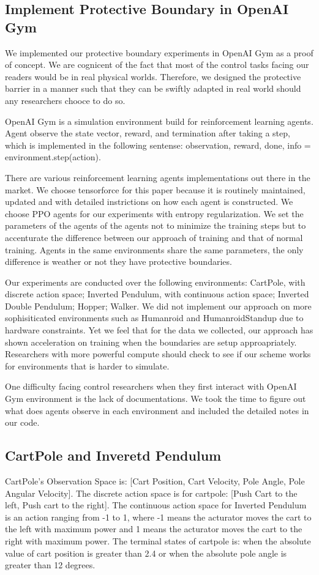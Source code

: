 \documentclass[journal]{IEEEtran}
\begin{document}
\subsection{Implement Protective Boundary in OpenAI Gym}
We implemented our protective boundary experiments in OpenAI Gym as a proof of concept. We are cognicent of the fact that most of the control tasks facing our readers would be in real physical worlds. Therefore, we designed the protective barrier in a manner such that they can be swiftly adapted in real world should any researchers chooce to do so.

OpenAI Gym is a simulation environment build for reinforcement learning agents. Agent observe the state vector, reward, and termination after taking a step, which is implemented in the following sentense: observation, reward, done, info = environment.step(action).

There are various reinforcement learning agents implementations out there in the market. We choose tensorforce for this paper because it is routinely maintained, updated and with detailed instrictions on how each agent is constructed. We choose PPO agents for our experiments with entropy regularization. We set the parameters of the agents of the agents not to minimize the training steps but to accenturate the difference between our approach of training and that of normal training. Agents in the same environments share the same parameters, the only difference is weather or not they have protective boundaries.

Our experiments are conducted over the following environments: CartPole, with discrete action space; Inverted Pendulum, with continuous action space; Inverted Double Pendulum; Hopper; Walker. We did not implement our approach on more sophisiticated environments such as Humanroid and HumanroidStandup due to hardware constraints. Yet we feel that for the data we collected, our approach has shown acceleration on training when the boundaries are setup approapriately. Researchers with more powerful compute should check to see if our scheme works for environments that is harder to simulate.

One difficulty facing control researchers when they first interact with OpenAI Gym environment is the lack of documentations. We took the time to figure out what does agents observe in each environment and included the detailed notes in our code.

\subsection{CartPole and Inveretd Pendulum}
CartPole's Observation Space is: [Cart Position, Cart Velocity, Pole Angle, Pole Angular Velocity]. The discrete action space is for cartpole: [Push Cart to the left, Push cart to the right]. The continuous action space for Inverted Pendulum is an action ranging from -1 to 1, where -1 means the acturator moves the cart to the left with maximum power and 1 means the acturator moves the cart to the right with maximum power. The terminal states of cartpole is: when the absolute value of cart position is greater than 2.4 or when the absolute pole angle is greater than 12 degrees.
\end{document}
